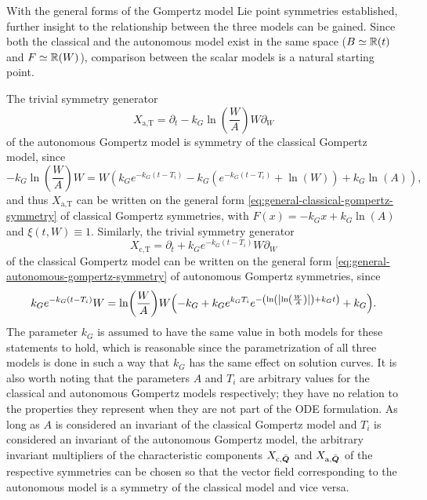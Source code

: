 With the general forms of the Gompertz model Lie point symmetries established, further insight to the relationship between the three models can be gained.
Since both the classical and the autonomous model exist in the same space (\(B \simeq \mathbb{R}(t)\) and \(F \simeq \mathbb{R}(W)\)), comparison between the scalar models is a natural starting point.

The trivial symmetry generator
\begin{equation*}
  X_{\text{a},\text{T}} = \partial_t - k_G \ln\left(\frac{W}{A}\right) W \partial_W
\end{equation*}
of the autonomous Gompertz model is symmetry of the classical Gompertz model, since
\begin{equation*}
  -k_G \ln\left(\frac{W}{A}\right) W = W \left(k_G e^{-k_G (t - T_i)} - k_G \left(e^{-k_G (t - T_i)} + \ln\left(W\right)\right) + k_G \ln\left(A\right)\right),
\end{equation*}
and thus \(X_{\text{a},\text{T}}\) can be written on the general form \cref{eq:general-classical-gompertz-symmetry} of classical Gompertz symmetries, with \(F(x) = -k_G x + k_G \ln\left(A\right)\) and \(\xi(t, W) \equiv 1\).
Similarly, the trivial symmetry generator
\begin{equation*}
  X_{\text{c},\text{T}} = \partial_t + k_G e^{-k_G (t - T_i)} W \partial_W
\end{equation*}
of the classical Gompertz model can be written on the general form \cref{eq:general-autonomous-gompertz-symmetry} of autonomous Gompertz symmetries, since
\begin{equation*}
  k_G e^{-k_G (t - T_i)} W = \ln\left(\frac{W}{A}\right) W \left(-k_G + k_G e^{k_G T_i} e^{-\left(\ln\left(\abs{\ln\left(\frac{W}{A}\right)}\right) + k_G t\right)} + k_G\right). %
\end{equation*}
The parameter \(k_G\) is assumed to have the same value in both models for these statements to hold, which is reasonable since the parametrization of all three models is done in such a way that \(k_G\) has the same effect on solution curves.
It is also worth noting that the parameters \(A\) and \(T_i\) are arbitrary values for the classical and autonomous Gompertz models respectively; they have no relation to the properties they represent when they are not part of the ODE formulation.
As long as \(A\) is considered an invariant of the classical Gompertz model and \(T_i\) is considered an invariant of the autonomous Gompertz model, the arbitrary invariant multipliers of the characteristic components \(X_{\text{c}, \bar{\boldsymbol{Q}}}\) and \(X_{\text{a}, \bar{\boldsymbol{Q}}}\) of the respective symmetries can be chosen so that the vector field corresponding to the autonomous model is a symmetry of the classical model and vice versa.

